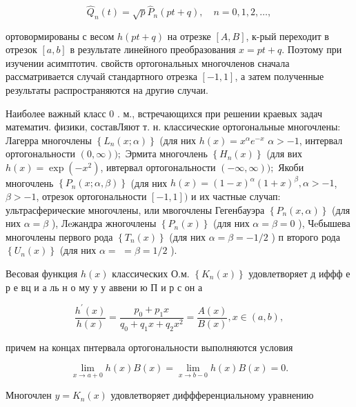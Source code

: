 \documentclass[10pt]{article}
\begin{document}
\[

\hat{Q}_{n}(t)=\sqrt{p} \hat{P}_{n}(p t+q), \quad n=0,1,2, \ldots,

\]



ортовормированы с весом $h(p t+q)$ на отрезке $[A, B]$, к-рый переходит в отрезок $[a, b]$ в результате линейного преобразования $x=p t+q$. Поэтому при изучении асимптотич. свойств ортогональных многочленов сначала рассматривается случай стандартного отрезка $[-1,1]$, а затем полученные результаты распространяются на другиө случаи.



Наиболее важный класс 0 . м., встречающихся при решении краевых задач математич. физики, составЛяют т. н. классические ортогональные многочлены: Лагерра многочлены $\left\{L_{n}(x ; \alpha)\right\}$ (для них $h(x)=x^{\alpha} e^{-x}$ $\alpha>-1$, интервал ортогональности $(0, \infty)) ;$ Эрмита многочлень $\left\{H_{n}(x)\right\}$ (для вих $h(x)=\exp \left(-x^{2}\right)$, ивтервал ортогональности $(-\infty, \infty)) ;$ Якоби многочлень $\left\{P_{n}(x ; \alpha, \beta)\right\}$ (для них $h(x)=(1-x)^{\alpha}(1+x)^{\beta}, \alpha>-1$, $\beta>-1$, отрезок ортогональности $[-1,1])$ и их частные случап: ультрасферические многочлены, или мвогочлены Гегенбауэра $\left\{P_{n}(x, \alpha)\right\}$ (для них $\alpha=\beta$ ), Лeжандра жногочлены $\left\{P_{n}(x)\right\}$ (для них $\alpha=\beta=0$ ), Чeбышева многочлены первого рода $\left\{T_{n}(x)\right\}$ (для них $\alpha=\beta=-1 / 2$ ) п второго рода $\left\{U_{n}(x)\right\}$ (для них $\alpha=$ $=\beta=1 / 2$ ).



Весовая функция $h(x)$ классических О.м. $\left\{K_{n}(x)\right\}$ удовлетворяет д иффф е р е вц и а ль н о му у у аввени ю П и р с он а



\[

\frac{h^{\prime}(x)}{h(x)}=\frac{p_{0}+p_{1} x}{q_{0}+q_{1} x+q_{2} x^{2}}=\frac{A(x)}{B(x)}, x \in(a, b),

\]



причем на концах пнтервала ортогональности выполняются условия



\[

\lim _{x \rightarrow a+0} h(x) B(x)=\lim _{x \rightarrow b-0} h(x) B(x)=0 .

\]



Многочлен $y=K_{n}(x)$ удовлетворяет диффференциальному уравнению
\end{document}
